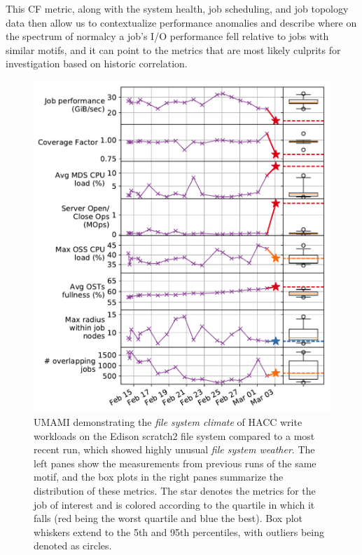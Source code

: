 This CF metric, along with the system health, job scheduling, and job topology data then allow us to contextualize performance anomalies and describe where on the spectrum of normalcy a job's I/O performance fell relative to jobs with similar motifs, and it can point to the metrics that are most likely culprits for investigation based on historic correlation.

\begin{figure}[t]
    \centering
    \includegraphics[width=1.0\columnwidth]{figs/umami-scratch2-hacc-write.pdf}
    \caption{UMAMI demonstrating the \emph{file system climate} of HACC write workloads on the Edison scratch2 file system compared to a most recent run, which showed highly unusual \emph{file system weather}.
    The left panes show the measurements from previous runs of the same motif, and the box plots in the right panes summarize the distribution of these metrics.
    The star denotes the metrics for the job of interest and is colored according to the quartile in which it falls (red being the worst quartile and blue the best).
    Box plot whiskers extend to the 5th and 95th percentiles, with outliers being denoted as circles.}
    \label{fig:umami-scratch2-hacc-write}
\vspace{-.2in}
\end{figure}

